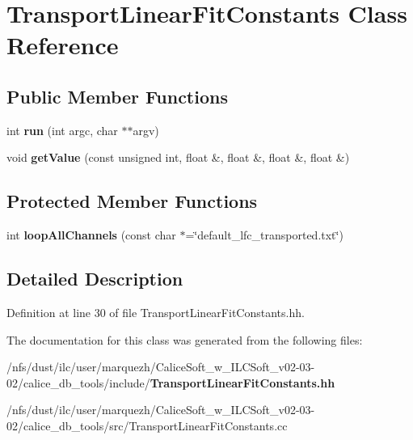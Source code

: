 \section{Transport\-Linear\-Fit\-Constants Class Reference}
\label{classTransportLinearFitConstants}
\subsection*{Public Member Functions}
\begin{DoxyCompactItemize}
\item 
int {\bfseries run} (int argc, char $\ast$$\ast$argv)\label{classTransportLinearFitConstants_a67394310263e6a5c9df72c7567127268}

\item 
void {\bfseries get\-Value} (const unsigned int, float \&, float \&, float \&, float \&)\label{classTransportLinearFitConstants_a0f28ea80602c327124ed9644467e7d2b}

\end{DoxyCompactItemize}
\subsection*{Protected Member Functions}
\begin{DoxyCompactItemize}
\item 
int {\bfseries loop\-All\-Channels} (const char $\ast$=\char`\"{}default\-\_\-lfc\-\_\-transported.\-txt\char`\"{})\label{classTransportLinearFitConstants_a9ff5f5a3a1533bf51f187f382becbc4d}

\end{DoxyCompactItemize}


\subsection{Detailed Description}


Definition at line 30 of file Transport\-Linear\-Fit\-Constants.\-hh.



The documentation for this class was generated from the following files\-:\begin{DoxyCompactItemize}
\item 
/nfs/dust/ilc/user/marquezh/\-Calice\-Soft\-\_\-w\-\_\-\-I\-L\-C\-Soft\-\_\-v02-\/03-\/02/calice\-\_\-db\-\_\-tools/include/{\bf Transport\-Linear\-Fit\-Constants.\-hh}\item 
/nfs/dust/ilc/user/marquezh/\-Calice\-Soft\-\_\-w\-\_\-\-I\-L\-C\-Soft\-\_\-v02-\/03-\/02/calice\-\_\-db\-\_\-tools/src/Transport\-Linear\-Fit\-Constants.\-cc\end{DoxyCompactItemize}
